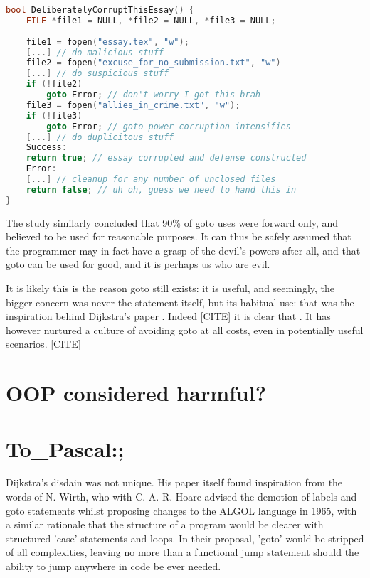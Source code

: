 \documentclass{journal}
\begin{document}
\begin{lstlisting}[language=C++,caption={An example of goto used for error handling (C++)}]
bool DeliberatelyCorruptThisEssay() {
	FILE *file1 = NULL, *file2 = NULL, *file3 = NULL;
	
	file1 = fopen("essay.tex", "w");
	[...] // do malicious stuff
	file2 = fopen("excuse_for_no_submission.txt", "w")
	[...] // do suspicious stuff
	if (!file2)
		goto Error; // don't worry I got this brah
	file3 = fopen("allies_in_crime.txt", "w");
	if (!file3)
		goto Error; // goto power corruption intensifies
	[...] // do duplicitous stuff
	Success:
	return true; // essay corrupted and defense constructed
	Error:
	[...] // cleanup for any number of unclosed files
	return false; // uh oh, guess we need to hand this in
}
\end{lstlisting}

The study similarly concluded that 90\% of goto uses were forward only, and believed to be used for reasonable purposes. It can thus be safely assumed that the programmer may in fact have a grasp of the devil's powers after all, and that goto can be used for good, and it is perhaps us who are evil.

It is likely this is the reason goto still exists: it is useful, and seemingly, the bigger concern was never the statement itself, but its habitual use: that was the inspiration behind Dijkstra's paper \cite{goto}. Indeed [CITE] it is clear that . It has however nurtured a culture of avoiding goto at all costs, even in potentially useful scenarios. [CITE]

\section{OOP considered harmful?}

\section{\textunderscore \textunderscore To_Pascal:;}
Dijkstra's disdain was not unique. His paper itself found inspiration from the words of N. Wirth, who with C. A. R. Hoare \cite{algolwirth} advised the demotion of labels and goto statements whilst proposing changes to the ALGOL language in 1965, with a similar rationale that the structure of a program would be clearer with structured 'case' statements and loops. In their proposal, 'goto' would be stripped of all complexities, leaving no more than a functional jump statement should the ability to jump anywhere in code be ever needed.
\end{document}
